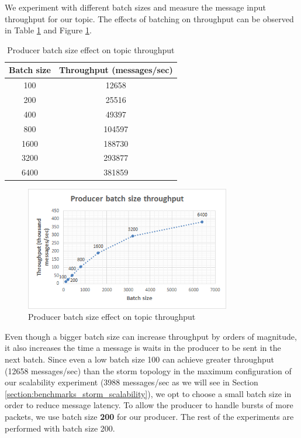 We experiment with different batch sizes and measure the message input throughput for our topic. The effects of batching on throughput can be observed in Table \ref{table:batch_size_throughput} and Figure \ref{figure:benchmarks_kafka_batch_2}.

\begin{table}[H]
\centering
\begin{tabular}{ |c|c| }
\hline
Batch size & Throughput (messages/sec) \\ \hline \hline
100 & 12658 \\ \hline
200 & 25516 \\ \hline
400 & 49397 \\ \hline
800 & 104597 \\ \hline
1600 & 188730 \\ \hline
3200 & 293877 \\ \hline
6400 & 381859 \\ \hline
\end{tabular}
\caption{Producer batch size effect on topic throughput}
\label{table:batch_size_throughput}
\end{table}

\begin{figure}[H]
\centering
\includegraphics[width=0.8\textwidth]{figures/benchmarks_kafka_batch_2}
\caption{Producer batch size effect on topic throughput}
\label{figure:benchmarks_kafka_batch_2}
\end{figure}

Even though a bigger batch size can increase throughput by orders of magnitude, it also increases the time a message is waits in the producer to be sent in the next batch. Since even a low batch size 100 can achieve greater throughput (12658 messages/sec) than the storm topology in the maximum configuration of our scalability experiment (3988 messages/sec as we will see in Section \ref{section:benchmarks_storm_scalability}), we opt to choose a small batch size in order to reduce message latency. To allow the producer to handle bursts of more packets, we use batch size \textbf{200} for our producer. The rest of the experiments are performed with batch size 200.

